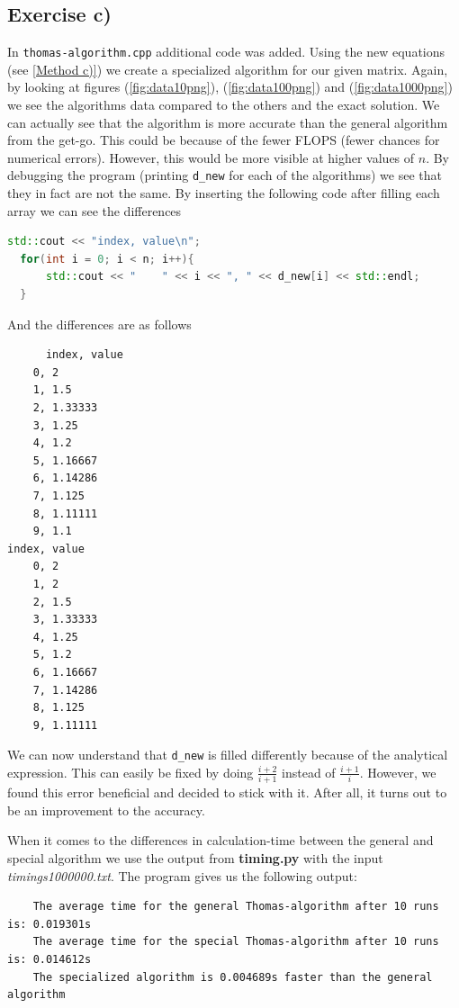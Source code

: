 \documentclass{article}
\begin{document}
  \subsection{Exercise c)} \label{Results c)}

  In \texttt{thomas-algorithm.cpp} additional code was added. Using the new equations (see \ref{Method c)}) we create a specialized algorithm for our given matrix. Again, by looking at figures (\ref{fig:data10png}), (\ref{fig:data100png}) and (\ref{fig:data1000png}) we see the algorithms data compared to the others and the exact solution. We can actually see that the algorithm is more accurate than the general algorithm from the get-go. This could be because of the fewer FLOPS (fewer chances for numerical errors). However, this would be more visible at higher values of $n$. By debugging the program (printing \texttt{d\_new} for each of the algorithms) we see that they in fact are not the same. By inserting the following code after filling each array we can see the differences
  \begin{lstlisting}[language=C++]
    std::cout << "index, value\n";
  for(int i = 0; i < n; i++){
      std::cout << "    " << i << ", " << d_new[i] << std::endl;
  }
  \end{lstlisting}

  And the differences are as follows

  \begin{verbatim}
      index, value
    0, 2
    1, 1.5
    2, 1.33333
    3, 1.25
    4, 1.2
    5, 1.16667
    6, 1.14286
    7, 1.125
    8, 1.11111
    9, 1.1
index, value
    0, 2
    1, 2
    2, 1.5
    3, 1.33333
    4, 1.25
    5, 1.2
    6, 1.16667
    7, 1.14286
    8, 1.125
    9, 1.11111
  \end{verbatim}

  We can now understand that \texttt{d\_new} is filled differently because of the analytical expression. This can easily be fixed by doing $\frac{i+2}{i+1}$ instead of $\frac{i+1}{i}$. However, we found this error beneficial and decided to stick with it. After all, it turns out to be an improvement to the accuracy.

  When it comes to the differences in calculation-time between the general and special algorithm we use the output from \textbf{timing.py} with the input \textit{timings1000000.txt}. The program gives us the following output:

  \begin{verbatim}
    The average time for the general Thomas-algorithm after 10 runs is: 0.019301s
    The average time for the special Thomas-algorithm after 10 runs is: 0.014612s
    The specialized algorithm is 0.004689s faster than the general algorithm
  \end{verbatim}
\end{document}
